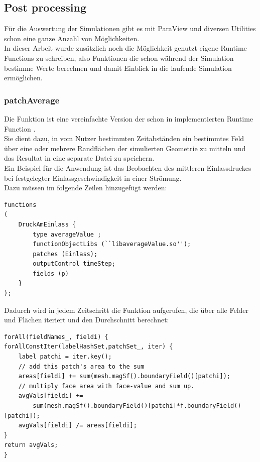 \subsection{Post processing}
Für die Auswertung der Simulationen gibt es mit ParaView \cite{paraview} und diversen \openfoam{} Utilities schon eine ganze Anzahl von Möglichkeiten.\\
In dieser Arbeit wurde zusätzlich noch die Möglichkeit genutzt eigene Runtime Functions zu schreiben, also Funktionen die schon während der Simulation bestimme Werte berechnen und damit Einblick in die laufende Simulation ermöglichen.
%
\subsubsection{patchAverage}
Die Funktion  ist eine vereinfachte Version der schon in \openfoam{} implementierten Runtime Function .\\
Sie dient dazu, in vom Nutzer bestimmten Zeitabständen ein bestimmtes Feld über eine oder mehrere Randflächen der simulierten Geometrie zu mitteln und das Resultat in eine separate Datei zu speichern.\\
Ein Beispiel für die Anwendung ist das Beobachten des mittleren Einlassdruckes bei festgelegter Einlassgeschwindigkeit in einer Strömung.\\
Dazu müssen im  folgende Zeilen hinzugefügt werden:
%
\begin{lstlisting}
functions
(
    DruckAmEinlass {
        type averageValue ;
        functionObjectLibs (``libaverageValue.so'');
        patches (Einlass);
        outputControl timeStep;
        fields (p)
    }
);
\end{lstlisting}
%
Dadurch wird in jedem Zeitschritt die Funktion  aufgerufen, die über alle Felder und Flächen iteriert und den Durchschnitt berechnet:
%
\begin{lstlisting}
forAll(fieldNames_, fieldi) {    
forAllConstIter(labelHashSet,patchSet_, iter) {
    label patchi = iter.key();
    // add this patch's area to the sum
    areas[fieldi] += sum(mesh.magSf().boundaryField()[patchi]);
    // multiply face area with face-value and sum up.
    avgVals[fieldi] +=
        sum(mesh.magSf().boundaryField()[patchi]*f.boundaryField()[patchi]);
    avgVals[fieldi] /= areas[fieldi];
}
return avgVals;
}
\end{lstlisting}
%
